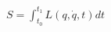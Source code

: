\documentclass[preview]{standalone}
\begin{document}
\begin{align*}
S = \int_{t_0}^{t_1} L(q, \dot{q}, t) dt
\end{align*}
\end{document}
